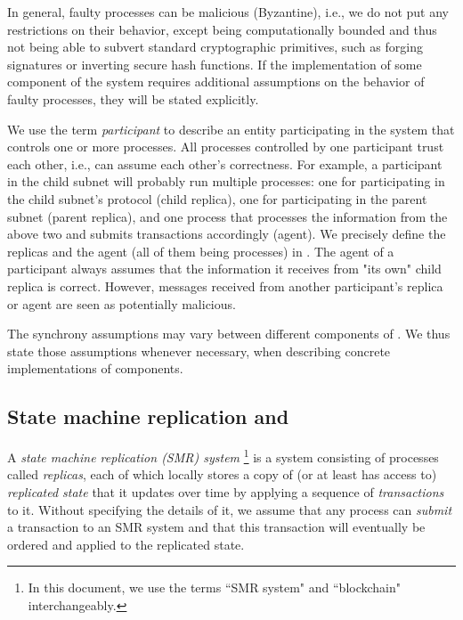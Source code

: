 In general, faulty processes can be malicious (Byzantine), i.e., we do not put any restrictions on their behavior, except being computationally bounded and thus not being able to subvert standard cryptographic primitives, such as forging signatures or inverting secure hash functions.
If the implementation of some component of the system requires additional assumptions on the behavior of faulty processes, they will be stated explicitly.

We use the term \emph{participant} to describe an entity participating in the system that controls one or more processes.
All processes controlled by one participant trust each other, i.e., can assume each other's correctness.
For example, a participant in the child subnet will probably run multiple processes:
one for participating in the child subnet's protocol (child replica),
one for participating in the parent subnet (parent replica),
and one process that processes the information from the above two and submits transactions accordingly (\nameAbbr agent).
We precisely define the replicas and the \nameAbbr agent (all of them being processes) in .
The \nameAbbr agent of a participant always assumes that the information it receives from "its own" child replica is correct.
However, messages received from another participant's replica or \nameAbbr agent are seen as potentially malicious.

The synchrony assumptions may vary between different components of \nameAbbr.
We thus state those assumptions whenever necessary, when describing concrete implementations of \nameAbbr components.

\subsection{State machine replication and \dapps}
\label{sec:smr}

A \emph{state machine replication (SMR) system}%
\footnote{In this document, we use the terms ``SMR system" and ``blockchain" interchangeably.}
is a system consisting of processes called \emph{replicas}, each of which locally stores a copy of (or at least has access to) \emph{replicated state}
that it updates over time by applying a sequence of \emph{transactions} to it.
Without specifying the details of it, we assume that any process can \emph{submit} a transaction to an SMR system and that this transaction will eventually be ordered and applied to the replicated state.


